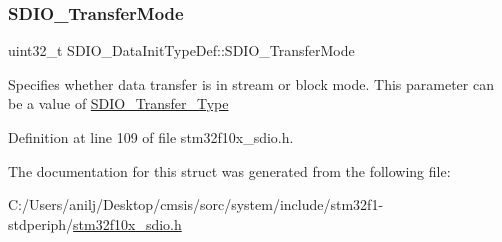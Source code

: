 \mbox{\label{struct_s_d_i_o___data_init_type_def_a58ac19aaaceb2791d4bbcd30f334dd21}} 
\subsubsection{\texorpdfstring{S\+D\+I\+O\+\_\+\+Transfer\+Mode}{SDIO\_TransferMode}}
{\footnotesize\ttfamily uint32\+\_\+t S\+D\+I\+O\+\_\+\+Data\+Init\+Type\+Def\+::\+S\+D\+I\+O\+\_\+\+Transfer\+Mode}

Specifies whether data transfer is in stream or block mode. This parameter can be a value of \hyperlink{group___s_d_i_o___transfer___type}{S\+D\+I\+O\+\_\+\+Transfer\+\_\+\+Type} 

Definition at line 109 of file stm32f10x\+\_\+sdio.\+h.



The documentation for this struct was generated from the following file\+:\begin{DoxyCompactItemize}
\item 
C\+:/\+Users/anilj/\+Desktop/cmsis/sorc/system/include/stm32f1-\/stdperiph/\hyperlink{stm32f10x__sdio_8h}{stm32f10x\+\_\+sdio.\+h}\end{DoxyCompactItemize}
